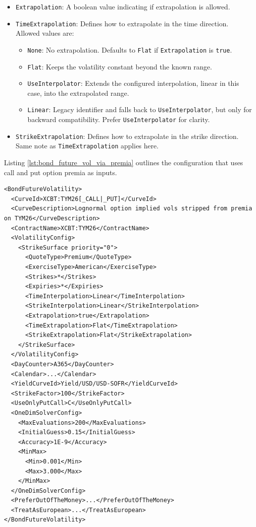 \begin{itemize}
\item \lstinline!Extrapolation!:
  A boolean value indicating if extrapolation is allowed.

\item \lstinline!TimeExtrapolation!:
  Defines how to extrapolate in the time direction. Allowed values are:
  \begin{itemize}
  \item \lstinline!None!:
    No extrapolation. Defaults to \lstinline!Flat! if \lstinline!Extrapolation! is \lstinline!true!.
  \item \lstinline!Flat!:
    Keeps the volatility constant beyond the known range.
  \item \lstinline!UseInterpolator!:
    Extends the configured interpolation, linear in this case, into the extrapolated range.
  \item \lstinline!Linear!:
    Legacy identifier and falls back to \lstinline!UseInterpolator!, but only for backward compatibility.
    Prefer \lstinline!UseInterpolator! for clarity.
  \end{itemize}

\item \lstinline!StrikeExtrapolation!:
  Defines how to extrapolate in the strike direction. Same note as \lstinline!TimeExtrapolation! applies here.

\end{itemize}

Listing \ref{lst:bond_future_vol_via_premia} outlines the configuration that uses call and put option premia as inputs.

\begin{longlisting}
\begin{verbatim}
<BondFutureVolatility>
  <CurveId>XCBT:TYM26[_CALL|_PUT]</CurveId>
  <CurveDescription>Lognormal option implied vols stripped from premia on TYM26</CurveDescription>
  <ContractName>XCBT:TYM26</ContractName>
  <VolatilityConfig>
    <StrikeSurface priority="0">
      <QuoteType>Premium</QuoteType>
      <ExerciseType>American</ExerciseType>
      <Strikes>*</Strikes>
      <Expiries>*</Expiries>
      <TimeInterpolation>Linear</TimeInterpolation>
      <StrikeInterpolation>Linear</StrikeInterpolation>
      <Extrapolation>true</Extrapolation>
      <TimeExtrapolation>Flat</TimeExtrapolation>
      <StrikeExtrapolation>Flat</StrikeExtrapolation>
    </StrikeSurface>
  </VolatilityConfig>
  <DayCounter>A365</DayCounter>
  <Calendar>...</Calendar>
  <YieldCurveId>Yield/USD/USD-SOFR</YieldCurveId>
  <StrikeFactor>100</StrikeFactor>
  <UseOnlyPutCall>C</UseOnlyPutCall>
  <OneDimSolverConfig>
    <MaxEvaluations>200</MaxEvaluations>
    <InitialGuess>0.15</InitialGuess>
    <Accuracy>1E-9</Accuracy>
    <MinMax>
      <Min>0.001</Min>
      <Max>3.000</Max>
    </MinMax>
  </OneDimSolverConfig>
  <PreferOutOfTheMoney>...</PreferOutOfTheMoney>
  <TreatAsEuropean>...</TreatAsEuropean>
</BondFutureVolatility>
\end{verbatim}
\caption{Bond future option surface using premia}
\label{lst:bond_future_vol_via_premia}
\end{longlisting}

